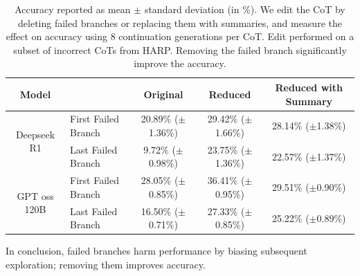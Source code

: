 \begin{table}[tb]
\small
    \centering
    \caption{Accuracy reported as mean $\pm$ standard deviation (in \%). We edit the CoT by deleting failed branches or replacing them with summaries, and measure the effect on accuracy using 8 continuation generations per CoT. Edit performed on a subset of incorrect CoTs from HARP. Removing the failed branch significantly improve the accuracy.}
    \label{tab:intervention}
    \begin{tabular}{c|l|ccc}
\hline
Model & & Original & Reduced & Reduced with Summary \\
\hline
\multirow{2}{*}{Deepseek R1} & First Failed Branch & 20.89\% ($\pm$1.36\%) & 29.42\% ($\pm$1.66\%) & 28.14\% ($\pm$1.38\%) \\
 & Last Failed Branch  & 9.72\% ($\pm$0.98\%) & 23.75\% ($\pm$1.36\%) & 22.57\% ($\pm$1.37\%) \\
\hline
\multirow{2}{*}{GPT oss 120B} & First Failed Branch & 28.05\% ($\pm$0.85\%) & 36.41\% ($\pm$0.95\%) & 29.51\% ($\pm$0.90\%) \\
 & Last Failed Branch  & 16.50\% ($\pm$0.71\%) & 27.33\% ($\pm$0.85\%) & 25.22\% ($\pm$0.89\%) \\
\hline
\end{tabular}
\end{table}

\begin{tcolorbox}[colback=metablue!7]
In conclusion, failed branches harm performance by biasing subsequent exploration; removing them improves accuracy.
\end{tcolorbox}








